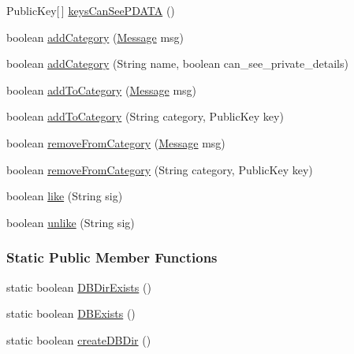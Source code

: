 \begin{DoxyCompactItemize}
\item 
Public\-Key\mbox{[}$\,$\mbox{]} \hyperlink{classballmerpeak_1_1turtlenet_1_1server_1_1Database_acd908d7244665e90b2c852d2bd4d24d8}{keys\-Can\-See\-P\-D\-A\-T\-A} ()
\item 
boolean \hyperlink{classballmerpeak_1_1turtlenet_1_1server_1_1Database_a60f429af2120947b9a6cc06617bb1bea}{add\-Category} (\hyperlink{classballmerpeak_1_1turtlenet_1_1shared_1_1Message}{Message} msg)
\item 
boolean \hyperlink{classballmerpeak_1_1turtlenet_1_1server_1_1Database_a543175382e7c3baf70b684a79c5046d8}{add\-Category} (String name, boolean can\-\_\-see\-\_\-private\-\_\-details)
\item 
boolean \hyperlink{classballmerpeak_1_1turtlenet_1_1server_1_1Database_aca5e259e29216730354cf97b87f1a070}{add\-To\-Category} (\hyperlink{classballmerpeak_1_1turtlenet_1_1shared_1_1Message}{Message} msg)
\item 
boolean \hyperlink{classballmerpeak_1_1turtlenet_1_1server_1_1Database_a92b3b3bea181888c22086688816738aa}{add\-To\-Category} (String category, Public\-Key key)
\item 
boolean \hyperlink{classballmerpeak_1_1turtlenet_1_1server_1_1Database_a2718a68613d43dabf2c62bebc9f41e05}{remove\-From\-Category} (\hyperlink{classballmerpeak_1_1turtlenet_1_1shared_1_1Message}{Message} msg)
\item 
boolean \hyperlink{classballmerpeak_1_1turtlenet_1_1server_1_1Database_a25313e4d456741744541e8b42d7bef9b}{remove\-From\-Category} (String category, Public\-Key key)
\item 
boolean \hyperlink{classballmerpeak_1_1turtlenet_1_1server_1_1Database_ac2c2361722304a6446d5cd01cb0c5d3b}{like} (String sig)
\item 
boolean \hyperlink{classballmerpeak_1_1turtlenet_1_1server_1_1Database_a500911b2c3d32d456c2bf34a23747d85}{unlike} (String sig)
\end{DoxyCompactItemize}
\subsubsection*{Static Public Member Functions}
\begin{DoxyCompactItemize}
\item 
static boolean \hyperlink{classballmerpeak_1_1turtlenet_1_1server_1_1Database_a89fecb924cc735abbc16d58405945fb2}{D\-B\-Dir\-Exists} ()
\item 
static boolean \hyperlink{classballmerpeak_1_1turtlenet_1_1server_1_1Database_a2001d0b63c21d13d0a023d70f571c5bd}{D\-B\-Exists} ()
\item 
static boolean \hyperlink{classballmerpeak_1_1turtlenet_1_1server_1_1Database_aa21c9f4bf38697e84fe76fee2023be9e}{create\-D\-B\-Dir} ()
\end{DoxyCompactItemize}
